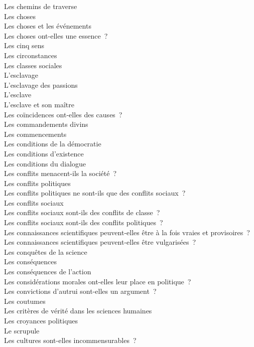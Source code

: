 \documentclass[a4paper,12pt]{article}
\begin{document}
Les chemins de traverse \\
Les choses \\
Les choses et les événements \\
Les choses ont-elles une essence ? \\
Les cinq sens \\
Les circonstances \\
Les classes sociales \\
L'esclavage \\
L'esclavage des passions \\
L'esclave \\
L'esclave et son maître \\
Les coïncidences ont-elles des causes ? \\
Les commandements divins \\
Les commencements \\
Les conditions de la démocratie \\
Les conditions d'existence \\
Les conditions du dialogue \\
Les conflits menacent-ils la société ? \\
Les conflits politiques \\
Les conflits politiques ne sont-ils que des conflits sociaux ? \\
Les conflits sociaux \\
Les conflits sociaux sont-ils des conflits de classe ? \\
Les conflits sociaux sont-ils des conflits politiques ? \\
Les connaissances scientifiques peuvent-elles être à la fois vraies et provisoires ? \\
Les connaissances scientifiques peuvent-elles être vulgarisées ? \\
Les conquêtes de la science \\
Les conséquences \\
Les conséquences de l'action \\
Les considérations morales ont-elles leur place en politique ? \\
Les convictions d'autrui sont-elles un argument ? \\
Les coutumes \\
Les critères de vérité dans les sciences humaines \\
Les croyances politiques \\
Le scrupule \\
Les cultures sont-elles incommensurables ? \\
\end{document}
